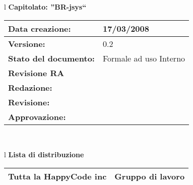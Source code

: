 

\newcommand{\lv}{ 0.2 } %
\newcommand{\dt}{ Campagna di Test }%



\begin{center}
\thispagestyle{plain}
\begin{table}[htbp]
\large{
\begin{tabular}{l}
\Large{\textbf{\textsf{Capitolato: ''BR-jsys``}}} \\
\begin{tabular}{|p{6cm}|p{6cm}|}
\hline
\textbf{Data creazione:} & 17/03/2008 \\
\hline
\textbf{Versione:} & \lv \\ \hline
\textbf{Stato del documento:} & Formale ad uso Interno \\ \hline
\textbf{Revisione RA} & \\ \hline
\textbf{Redazione:} & \AT \\ \hline
\textbf{Revisione:} &  \ET\\ \hline
\textbf{Approvazione:} &  \MT\\ \hline
\end{tabular} \\
\end{tabular}
}
\end{table}

\begin{table}[hbtp]
\large{
\begin{tabular}{l}
\Large{\textbf{\textsf{Lista di distribuzione}}} \\
\begin{tabular}{|p{6cm}|p{6cm}|} \hline
{Tutta la HappyCode inc}& Gruppo di lavoro \\ \hline
\end{tabular} \\
\end{tabular}
}
\end{table}

\begin{table}[hbtp]


\end{table}
\end{center}
